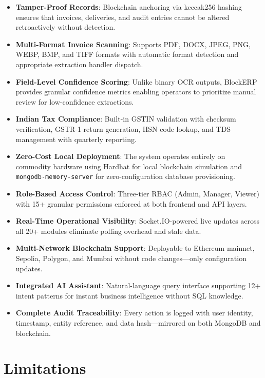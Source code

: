 \documentclass[conference]{IEEEtran}
\begin{document}
\begin{itemize}
    \item \textbf{Tamper-Proof Records}: Blockchain anchoring via keccak256 hashing ensures that invoices, deliveries, and audit entries cannot be altered retroactively without detection.
    \item \textbf{Multi-Format Invoice Scanning}: Supports PDF, DOCX, JPEG, PNG, WEBP, BMP, and TIFF formats with automatic format detection and appropriate extraction handler dispatch.
    \item \textbf{Field-Level Confidence Scoring}: Unlike binary OCR outputs, BlockERP provides granular confidence metrics enabling operators to prioritize manual review for low-confidence extractions.
    \item \textbf{Indian Tax Compliance}: Built-in GSTIN validation with checksum verification, GSTR-1 return generation, HSN code lookup, and TDS management with quarterly reporting.
    \item \textbf{Zero-Cost Local Deployment}: The system operates entirely on commodity hardware using Hardhat for local blockchain simulation and \texttt{mongodb-memory-server} for zero-configuration database provisioning.
    \item \textbf{Role-Based Access Control}: Three-tier RBAC (Admin, Manager, Viewer) with 15+ granular permissions enforced at both frontend and API layers.
    \item \textbf{Real-Time Operational Visibility}: Socket.IO-powered live updates across all 20+ modules eliminate polling overhead and stale data.
    \item \textbf{Multi-Network Blockchain Support}: Deployable to Ethereum mainnet, Sepolia, Polygon, and Mumbai without code changes—only configuration updates.
    \item \textbf{Integrated AI Assistant}: Natural-language query interface supporting 12+ intent patterns for instant business intelligence without SQL knowledge.
    \item \textbf{Complete Audit Traceability}: Every action is logged with user identity, timestamp, entity reference, and data hash—mirrored on both MongoDB and blockchain.
\end{itemize}

\section{Limitations}
\end{document}
